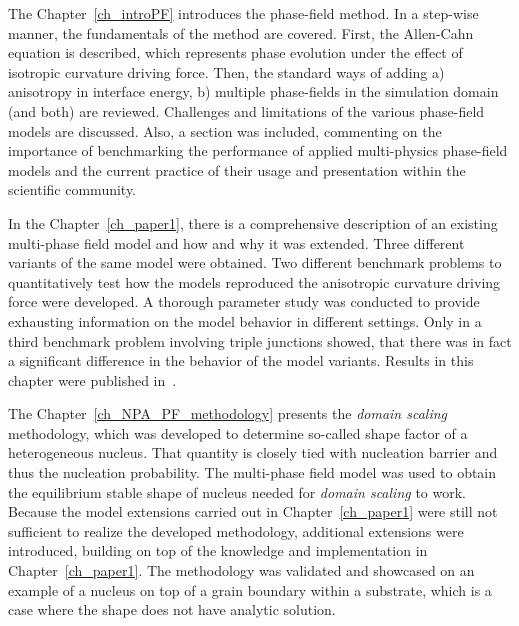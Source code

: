The Chapter~\ref{ch_introPF} introduces the phase-field method. In a step-wise manner, the fundamentals of the method are covered. First, the Allen-Cahn equation is described, which represents phase evolution under the effect of isotropic curvature driving force. Then, the standard ways of adding a) anisotropy in interface energy, b) multiple phase-fields in the simulation domain (and both) are reviewed. Challenges and limitations of the various phase-field models are discussed. Also, a section was included, commenting on the importance of benchmarking the performance of applied multi-physics phase-field models and the current practice of their usage and presentation within the scientific community.

In the Chapter~\ref{ch_paper1}, there is a comprehensive description of an existing multi-phase field model and how and why it was extended. Three different variants of the same model were obtained. Two different benchmark problems to quantitatively test how the models reproduced the anisotropic curvature driving force were developed. A thorough parameter study was conducted to provide exhausting information on the model behavior in different settings. Only in a third benchmark problem involving triple junctions showed, that there was in fact a significant difference in the behavior of the model variants. Results in this chapter were published in~\cite{Minar2022}.

The Chapter~\ref{ch_NPA_PF_methodology} presents the \textit{domain scaling} methodology, which was developed to determine so-called shape factor of a heterogeneous nucleus. That quantity is closely tied with nucleation barrier and thus the nucleation probability. The multi-phase field model was used to obtain the equilibrium stable shape of nucleus needed for \textit{domain scaling} to work. Because the model extensions carried out in Chapter~\ref{ch_paper1} were still not sufficient to realize the developed methodology, additional extensions were introduced, building on top of the knowledge and implementation in Chapter~\ref{ch_paper1}. The methodology was validated and showcased on an example of a nucleus on top of a grain boundary within a substrate, which is a case where the shape does not have analytic solution.


